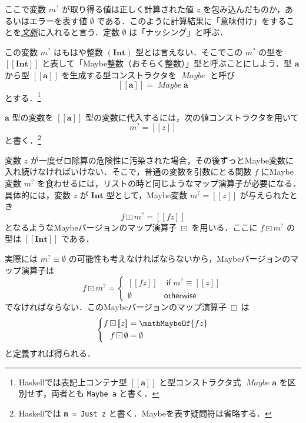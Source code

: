 \documentclass[a4paper]{jsbook}
\def\[{\left[\!\left[}
\def\]{\right]\!\right]}
\newcommand{\programminglanguage}[1]{\textsf{#1}}
\newcommand{\haskell}{\programminglanguage{Haskell}}
\newcommand{\keyword}[1]{{\underline{\emph{#1}}}}
\newcommand{\code}[1]{\texttt{#1}}
\newcommand{\mType}[1]{\mathbf{#1}}
\newcommand{\mIntType}{\mType{Int}}
\newcommand{\mMaybeType}[1]{\[\mType{#1}\]}
\newcommand{\mTypeConstructor}[1]{\mathit{#1}} %
\newcommand{\mNothing}{\emptyset}
\newcommand{\mKeyword}[1]{\mathsf{#1}}
\newcommand{\mIfKeyword}{\mKeyword{if}}
\newcommand{\mOtherwiseKeyword}{\mKeyword{otherwise}}
\newcommand{\mMaybeWith}[1]{\[#1\]}
\newcommand{\mMaybe}[1]{{#1}^\text{?}}
\DeclareMathOperator{\mMapMaybe}{\boxdot}
\DeclareMathOperator{\mMaybeTypeConstructor}{\mTypeConstructor{Maybe}}
\DeclareMathOperator{\mIf}{\mIfKeyword}
\DeclareMathOperator{\mOtherwise}{\mOtherwiseKeyword}
\begin{document}
ここで変数 $\mMaybe{m}$ が取り得る値は正しく計算された値 $z$ を包み込んだものか，あるいはエラーを表す値 $\mNothing$ である．このように計算結果に「意味付け」をすることを\keyword{文脈}に入れると言う．定数 $\mNothing$ は「ナッシング」と呼ぶ．

この変数 $\mMaybe{m}$ はもはや整数 $(\mIntType)$ 型とは言えない．そこでこの $\mMaybe{m}$ の型を $\mMaybeType{\mIntType}$ と表して「Maybe整数（おそらく整数）」型と呼ぶことにしよう．型 $\mType{a}$ から型 $\mMaybeType{a}$ を生成する型コンストラクタを $\mMaybeTypeConstructor$ と呼び
\begin{equation}
\mMaybeType{a}=\mMaybeTypeConstructor\mType{a}
\end{equation}
とする．\footnote{\haskell では表記上コンテナ型 $\mMaybeType{a}$ と型コンストラクタ式 $\mMaybeTypeConstructor\mType{a}$ を区別せず，両者とも \code{Maybe a} と書く．}

$\mType{a}$ 型の変数を $\mMaybeType{a}$ 型の変数に代入するには，次の値コンストラクタを用いて
\begin{equation}
\mMaybe{m}=\mMaybeWith{z}
\end{equation}
と書く．\footnote{\haskell では \code{m = Just z} と書く．Maybeを表す疑問符は省略する．}

変数 $z$ が一度ゼロ除算の危険性に汚染された場合，その後ずっとMaybe変数に入れ続けなければいけない．そこで，普通の変数を引数にとる関数 $f$ にMaybe変数 $\mMaybe{m}$ を食わせるには，リストの時と同じようなマップ演算子が必要になる．具体的には，変数 $z$ が $\mType{Int}$ 型として，Maybe変数 $\mMaybe{m}=\mMaybeWith{z}$ が与えられたとき
\begin{equation}
f\mMapMaybe\mMaybe{m}=\mMaybeWith{fz}
\end{equation}
となるようなMaybeバージョンのマップ演算子 $\mMapMaybe$ を用いる．ここに $f\mMapMaybe\mMaybe{m}$ の型は $\mMaybeType{\mIntType}$ である．

実際には $\mMaybe{m}\equiv\mNothing$ の可能性も考えなければならないから，Maybeバージョンのマップ演算子は
\begin{equation}
f\mMapMaybe\mMaybe{m}=\begin{cases}
\mMaybeWith{fz}&\mIf\mMaybe{m}\equiv\mMaybeWith{z}\\
\mNothing&\mOtherwise
\end{cases}
\end{equation}
でなければならない．このMaybeバージョンのマップ演算子 $\mMapMaybe$ は
\begin{equation}
\left\{
\begin{split}
f\mMapMaybe\mMaybeWith{z}&=\mathMaybeOf{fz}\\
f\mMapMaybe\mNothing&=\mNothing
\end{split}
\right.
\end{equation}
と定義すれば得られる．
\end{document}
